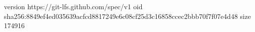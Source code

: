 version https://git-lfs.github.com/spec/v1
oid sha256:8849ef4ed035639acfcd8817249e6c08cf25d3c16858ccec2bbb70f7f07e4d48
size 174916
